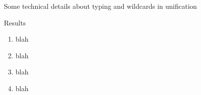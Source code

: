 \documentclass[aspectratio=169
  , xcolor={svgnames}
  , hyperref=
      { colorlinks
      , urlcolor=DarkBlue
      }
  , russian  %
  ]{beamer}
\begin{document}
\begin{frame}{}
Some technical details about typing and wildcards in unification
\end{frame}



\begin{frame}{Results}

\begin{enumerate}
\item blah
\item blah
\item blah
\item blah

\end{enumerate}
\end{frame}

\begin{comment}


\begin{frame}[allowframebreaks]
\frametitle<presentation>{Ссылки}
\begin{thebibliography}{10}
  \bibitem{blow}
    Предотвращая коллапс цивилизации (Preventing the Collapse of Civilization), 2019 (in English)
    \newblock {\em Jonathan Blow}
    \newblock\href{https://youtu.be/pW-SOdj4Kkk}{YouTube}
  \bibitem{cheatsheets}
    Шпаргалки по синтаксису OCaml
    \newblock {\em OCamlPro}
    \newblock\href{https://ocaml.org/docs/cheat_sheets.html}{4 PDF online}
  \bibitem{rwo}
    Книга Real World OCaml издания 2.0 (есть русский перевод издания 1.0)
    \newblock\href{https://dev.realworldocaml.org/toc.html}{online}
  \bibitem{javaTuringComplete}
    Java Generics are Turing Complete
    \newblock {\em Radu Grigore}
    \newblock\href{https://arxiv.org/pdf/1605.05274}{online}
  \bibitem{algDThistory}
    A Brief History of Algebraic Data Types
    \newblock {\em Li-yao Xia}
    \newblock\href{https://docs.google.com/presentation/d/131_CYsd9mEL-0XqXMyV7JeahWgtNCUV_JwjH7WqYFcI/edit}{online}
\end{thebibliography}
\end{frame}
\end{comment}
\end{document}
